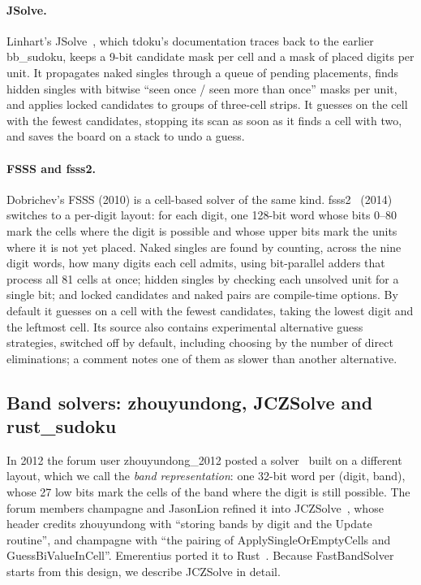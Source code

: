 \documentclass[11pt]{article}
\theoremstyle{definition}
\theoremstyle{plain}
\begin{document}
\paragraph{JSolve.} Linhart's JSolve~\cite{linhart2010jsolve}, which tdoku's documentation traces back to the earlier
bb\_sudoku, keeps a 9-bit candidate mask per cell and a mask of placed digits per unit. It propagates naked singles
through a queue of pending placements, finds hidden singles with bitwise ``seen once / seen more than once'' masks per
unit, and applies locked candidates to groups of three-cell strips. It guesses on the cell with the fewest candidates,
stopping its scan as soon as it finds a cell with two, and saves the board on a stack to undo a guess.

\paragraph{FSSS and fsss2.} Dobrichev's FSSS (2010) is a cell-based solver of the same kind. fsss2~\cite{dobrichev2014fsss2}
(2014) switches to a per-digit layout: for each digit, one 128-bit word whose bits 0--80 mark the cells where the
digit is possible and whose upper bits mark the units where it is not yet placed. Naked singles are found by counting,
across the nine digit words, how many digits each cell admits, using bit-parallel adders that process all 81 cells at
once; hidden singles by checking each unsolved unit for a single bit; and locked candidates and naked pairs are
compile-time options. By default it guesses on a cell with the fewest candidates, taking the lowest digit and the
leftmost cell. Its source also contains experimental alternative guess strategies, switched off by default, including
choosing by the number of direct eliminations; a comment notes one of them as slower than another alternative.

\subsection{Band solvers: zhouyundong, JCZSolve and rust\_sudoku}

In 2012 the forum user zhouyundong\_2012 posted a solver~\cite{zhouyundong2012solver} built on a different layout,
which we call the \emph{band representation}: one 32-bit word per (digit, band), whose 27 low bits mark the cells of the
band where the digit is still possible. The forum members champagne and JasonLion refined it into
JCZSolve~\cite{jczsolve2016}, whose header credits zhouyundong with ``storing bands by digit and the Update routine'',
and champagne with ``the pairing of ApplySingleOrEmptyCells and GuessBiValueInCell''. Emerentius ported it to
Rust~\cite{emerentius2018sudoku}. Because FastBandSolver starts from this design, we describe JCZSolve in detail.
\end{document}
